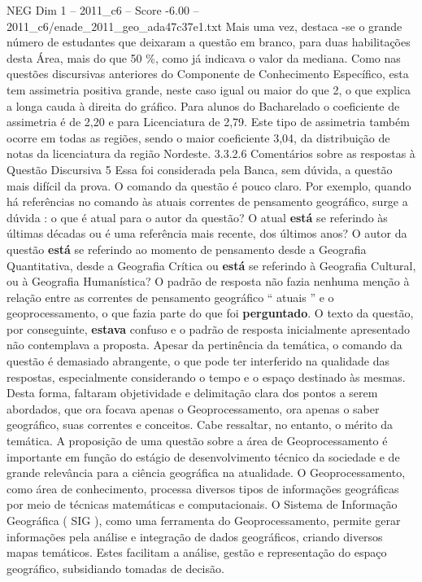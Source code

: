 \begin{textsample}{NEG Dim 1 – 2011\_c6 – Score -6.00 – 2011\_c6/enade\_2011\_geo\_ada47c37e1.txt}
Mais uma vez, destaca -se o grande número de estudantes que deixaram a questão em branco, para duas habilitações desta Área, mais do que 50 \%, como já indicava o valor da mediana.
Como nas questões discursivas anteriores do Componente de Conhecimento Específico, esta tem assimetria positiva grande, neste caso igual ou maior do que 2, o que explica a longa cauda à direita do gráfico.
Para alunos do Bacharelado o coeficiente de assimetria é de 2,20 e para Licenciatura de 2,79.
Este tipo de assimetria também ocorre em todas as regiões, sendo o maior coeficiente 3,04, da distribuição de notas da licenciatura da região Nordeste. 3.3.2.6 Comentários sobre as respostas à Questão Discursiva 5 Essa foi considerada pela Banca, sem dúvida, a questão mais difícil da prova.
O comando da questão é pouco claro.
Por exemplo, quando há referências no comando às atuais correntes de pensamento geográfico, surge a dúvida : o que é atual para o autor da questão?
O atual \textbf{está} se referindo às últimas décadas ou é uma referência mais recente, dos últimos anos?
O autor da questão \textbf{está} se referindo ao momento de pensamento desde a Geografia Quantitativa, desde a Geografia Crítica ou \textbf{está} se referindo à Geografia Cultural, ou à Geografia Humanística?
O padrão de resposta não fazia nenhuma menção à relação entre as correntes de pensamento geográfico “ atuais ” e o geoprocessamento, o que fazia parte do que foi \textbf{perguntado}.
O texto da questão, por conseguinte, \textbf{estava} confuso e o padrão de resposta inicialmente apresentado não contemplava a proposta.
Apesar da pertinência da temática, o comando da questão é demasiado abrangente, o que pode ter interferido na qualidade das respostas, especialmente considerando o tempo e o espaço destinado às mesmas.
Desta forma, faltaram objetividade e delimitação clara dos pontos a serem abordados, que ora focava apenas o Geoprocessamento, ora apenas o saber geográfico, suas correntes e conceitos.
Cabe ressaltar, no entanto, o mérito da temática.
A proposição de uma questão sobre a área de Geoprocessamento é importante em função do estágio de desenvolvimento técnico da sociedade e de grande relevância para a ciência geográfica na atualidade.
O Geoprocessamento, como área de conhecimento, processa diversos tipos de informações geográficas por meio de técnicas matemáticas e computacionais.
O Sistema de Informação Geográfica ( SIG ), como uma ferramenta do Geoprocessamento, permite gerar informações pela análise e integração de dados geográficos, criando diversos mapas temáticos.
Estes facilitam a análise, gestão e representação do espaço geográfico, subsidiando tomadas de decisão.

\end{textsample}
